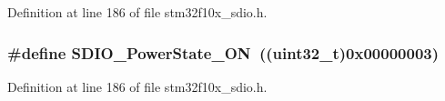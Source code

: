 Definition at line 186 of file stm32f10x\+\_\+sdio.\+h.

\subsubsection[{\texorpdfstring{S\+D\+I\+O\+\_\+\+Power\+State\+\_\+\+ON}{SDIO_PowerState_ON}}]{\setlength{\rightskip}{0pt plus 5cm}\#define S\+D\+I\+O\+\_\+\+Power\+State\+\_\+\+ON~(({\bf uint32\+\_\+t})0x00000003)}\hypertarget{group___s_d_i_o___power___state_ga0aacd8c94effe8066c6d447fc884d217}{}\label{group___s_d_i_o___power___state_ga0aacd8c94effe8066c6d447fc884d217}


Definition at line 186 of file stm32f10x\+\_\+sdio.\+h.

